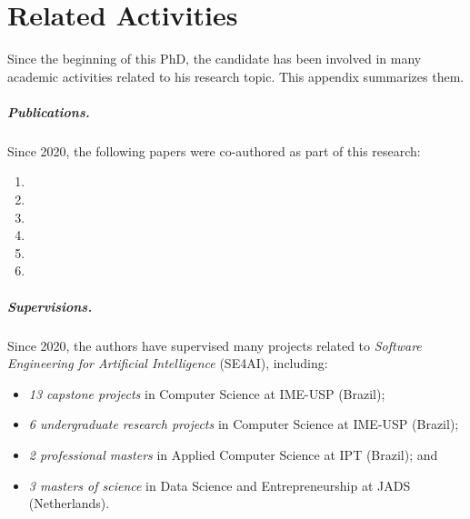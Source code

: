 
\chapter{Related Activities}
\label{app:related_activities}
  
Since the beginning of this PhD, the candidate has been involved in many
academic activities related to his research topic. This appendix summarizes them.

\paragraph{Publications.}
Since 2020, the following papers were co-authored as part of this research:
\begin{enumerate}
  \item {}
  \item {}
  \item {}
  \item {}
  \item {}
  \item {}
\end{enumerate}

\paragraph{Supervisions.}
Since 2020, the authors have supervised many projects related to
\emph{Software Engineering for Artificial Intelligence} (SE4AI), including:
\begin{itemize}
  \item \emph{13 capstone projects}
        in Computer Science at IME-USP (Brazil);
  \item \emph{6 undergraduate research projects}
        in Computer Science at IME-USP (Brazil);
  \item \emph{2 professional masters}
        in Applied Computer Science at IPT (Brazil); and
  \item \emph{3 masters of science}
        in Data Science and Entrepreneurship at JADS (Netherlands).
\end{itemize}

